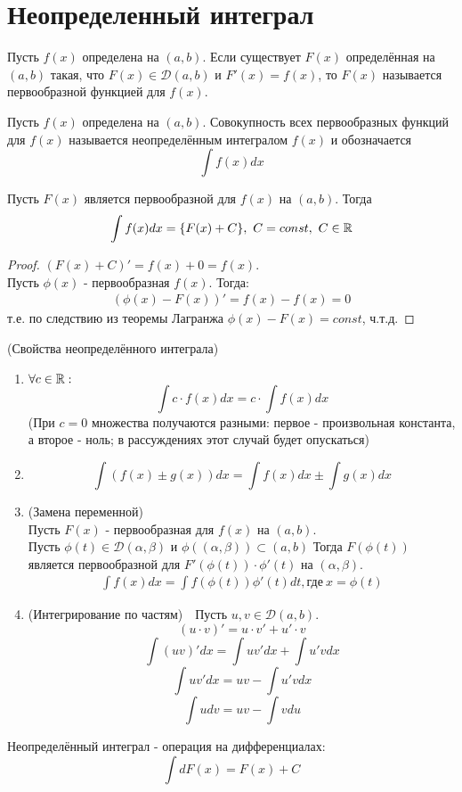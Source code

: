 \section{Неопределенный интеграл}
\begin{definition}
    Пусть $f(x)$ определена на $(a, b)$. Если существует $F(x)$ определённая на $(a, b)$ такая, что $F(x) \in \mathcal{D}(a, b)$ и $F'(x) = f(x)$, то $F(x)$ называется первообразной функцией для $f(x)$.
\end{definition}
\begin{definition}
    Пусть $f(x)$ определена на $(a, b)$. Совокупность всех первообразных функций для $f(x)$ называется неопределённым интегралом $f(x)$ и обозначается 
    \[\int f(x)dx\]
\end{definition}
\begin{theorem}
    Пусть $F(x)$ является первообразной для $f(x)$ на $(a, b)$. Тогда
    \[\int f(x)dx = \{F(x) + C\},\ C = const, \ C\in\mathbb{R}\]
\end{theorem}
\begin{proof}
    $(F(x) + C)' = f(x) + 0 = f(x)$.\\
    Пусть $\phi(x)$ -  первообразная $f(x)$. Тогда:
    \begin{align*}
        (\phi(x) - F(x))' = f(x) - f(x) = 0
    \end{align*}
    т.е. по следствию из теоремы Лагранжа $\phi(x) - F(x) = const$, ч.т.д.
\end{proof}
\begin{statement} (Свойства неопределённого интеграла)
\begin{enumerate}
    \item $\forall c \in \mathbb{R}: $
    \[\int c\cdot f(x)dx = c\cdot \int f(x)dx\]
    (При $c = 0$ множества получаются разными: первое - произвольная константа, а второе - ноль; в рассуждениях этот случай будет опускаться)
    \item \[\int (f(x) \pm g(x))dx = \int f(x) dx \pm \int g(x) dx\]
    \item (Замена переменной)\\
    Пусть $F(x)$ - первообразная для $f(x)$ на $(a, b)$.\\
    Пусть $\phi(t) \in \mathcal{D}(\alpha, \beta)$ и $\phi((\alpha, \beta)) \subset (a, b)$
    Тогда $F(\phi(t))$ является первообразной для $F'(\phi(t))\cdot\phi'(t)$ на $(\alpha, \beta)$.
    \begin{align*}
        \int f(x) dx = \int f(\phi(t))\phi'(t) dt ,\text{где} \ x = \phi(t)
    \end{align*}
    \item (Интегрирование по частям)\ \ Пусть $u,v \in \mathcal{D}(a, b)$.
    \[(u\cdot v)' = u\cdot v' + u'\cdot v\]
    \[\int(uv)'dx = \int uv' dx + \int u'v dx\]
    \[\int uv' dx = uv - \int u'v dx\]
    \[\int udv = uv - \int vdu\]
\end{enumerate}
\end{statement}
\begin{comm}
    Неопределённый интеграл - операция на дифференциалах: 
    \[\int dF(x) = F(x) + C\]
\end{comm}
